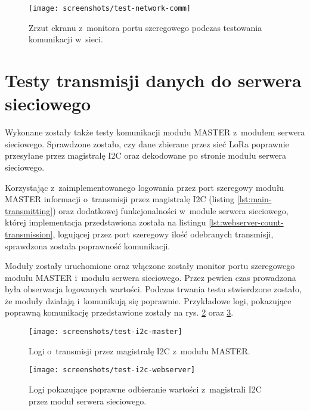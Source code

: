 \begin{figure}[!htbp]
    \centering
    \texttt{[image: screenshots/test-network-comm]}
    \caption{\label{img:test-network-comm}Zrzut ekranu z~monitora portu szeregowego podczas testowania komunikacji
        w~sieci.}
\end{figure}

\FloatBarrier
\section{\label{sect:test-webserver-comm}Testy transmisji danych do serwera sieciowego} Wykonane zostały także testy
komunikacji modułu MASTER z~modułem serwera sieciowego. Sprawdzone zostało, czy dane zbierane przez sieć LoRa poprawnie
przesyłane przez magistralę I2C oraz dekodowane po stronie modułu serwera sieciowego.

Korzystając z~zaimplementowanego logowania przez port szeregowy modułu MASTER informacji o~transmisji przez magistralę
I2C (listing \ref{lst:main-transmitting}) oraz dodatkowej funkcjonalności w~module serwera sieciowego, której
implementacja przedstawiona została na listingu \ref{lst:webserver-count-transmission}, logującej przez port szeregowy
ilość odebranych transmisji, sprawdzona została poprawność komunikacji.



Moduły zostały uruchomione oraz włączone zostały monitor portu szeregowego modułu MASTER i~modułu serwera sieciowego.
Przez pewien czas prowadzona była obserwacja logowanych wartości. Podczas trwania testu stwierdzone zostało, że moduły
działają i~komunikują się poprawnie. Przykładowe logi, pokazujące poprawną komunikację przedstawione zostały na rys.
\ref{img:test-i2c-master} oraz \ref{img:test-i2c-webserver}.

\begin{figure}[!htbp]
    \centering
    \texttt{[image: screenshots/test-i2c-master]}
    \caption{\label{img:test-i2c-master}Logi o~transmisji przez magistralę I2C z~modułu MASTER.}
\end{figure}

\begin{figure}[!htbp]
    \centering
    \texttt{[image: screenshots/test-i2c-webserver]}
    \caption{\label{img:test-i2c-webserver}Logi pokazujące poprawne odbieranie wartości z~magistrali I2C przez moduł
        serwera sieciowego.}
\end{figure}

